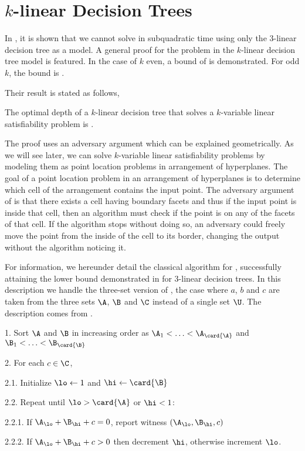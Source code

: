 \section{$k$-linear Decision Trees}

In \citet*{erickson:1999}, it is shown that we cannot solve \threeSUM in
subquadratic time using only the $3$-linear decision tree as a model. A
general proof for the \kLDT problem in the $k$-linear decision tree model
is featured. In the case of $k$
even, a bound of  is demonstrated. For odd $k$, the
bound is .

Their result is stated as follows,
\begin{theorem}
The optimal depth of a \(k\)-linear decision tree that solves
a \(k\)-variable linear satisfiability problem is .
\end{theorem}

The proof uses an adversary argument which can be explained geometrically. As
we will see later, we can solve \(k\)-variable linear satisfiability problems
by modeling them as point location problems in arrangement of hyperplanes. The
goal of a point location problem in an arrangement of hyperplanes is to
determine which cell of the arrangement contains the input point. The adversary
argument of \citet*{erickson:1999} is that there exists a cell having
 boundary facets and thus if the input point is inside
that cell, then an algorithm must check if the point is on any of the facets of
that cell. If the algorithm stops without doing so, an adversary could freely
move the point from the inside of the cell to its border, changing the output
without the algorithm noticing it.

For information, we hereunder detail the classical  algorithm for
\threeSUM, successfully attaining the lower bound demonstrated in
\cite{erickson:1999} for $3$-linear decision trees. In this description we
handle the three-set version of \threeSUM, \ie the case where $a$, $b$ and $c$
are taken from the three sets $\A$, $\B$ and $\C$ instead of a single set $\U$.
The description comes from \citet*{gronlund:2014}.


\begin{algorithm}
\item[1.] Sort $\A$ and $\B$ in increasing order as $\A_1 < \ldots <
\A_{\card{\A}}$ and $\B_1 < \ldots < \B_{\card{\B}}$
\item[2.] For each $c \in \C$,
\item[2.1.] Initialize $\lo \gets 1$ and $\hi \gets \card{\B}$
\item[2.2.] Repeat until $\lo > \card{\A}$ or $\hi < 1$:
\item[2.2.1.] If $\A_{\lo} + \B_{\hi} + c = 0$, report witness $(\A_{\lo},
\B_{\hi}, c)$
\item[2.2.2.] If $\A_{\lo} + \B_{\hi} + c > 0$ then decrement $\hi$, otherwise
increment $\lo$.
\end{algorithm}


